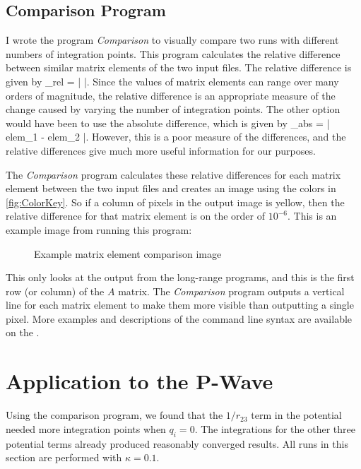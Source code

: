 \documentclass[Dissertation.tex]{subfiles}
\begin{document}
\subsection{Comparison Program}
I wrote the program \emph{Comparison} \cite{} to visually compare two runs with different numbers of integration points. This program calculates the relative difference between similar matrix elements of the two input files. The relative difference is given by
\beq
{}_{rel} = \left|  \right|.
\eeq
Since the values of matrix elements can range over many orders of magnitude, the relative difference is an appropriate measure of the change caused by varying the number of integration points. The other option would have been to use the absolute difference, which is given by 
\beq
{}_{abs} = \left| elem_1 - elem_2 \right|.
\eeq
However, this is a poor measure of the differences, and the relative differences give much more useful information for our purposes.

The \emph{Comparison} program calculates these relative differences for each matrix element between the two input files and creates an image using the colors in \cref{fig:ColorKey}. So if a column of pixels in the output image is yellow, then the relative difference for that matrix element is on the order of $10^{-6}$. This is an example image from running this program:
\begin{figure}
	\centering
	\caption{Example matrix element comparison image}
	\label{fig:QuadExample}
\end{figure}
This only looks at the output from the long-range programs, and this is the first row (or column) of the $A$ matrix. The \emph{Comparison} program outputs a vertical line for each matrix element to make them more visible than outputting a single pixel. More examples and descriptions of the command line syntax are available on the  \cite{Wiki}.

\section{Application to the P-Wave}

Using the comparison program, we found that the $1/r_{23}$ term in the potential needed more integration points when $q_i = 0$. The integrations for the other three potential terms already produced reasonably converged results. All runs in this section are performed with $\kappa = 0.1$.
\end{document}
